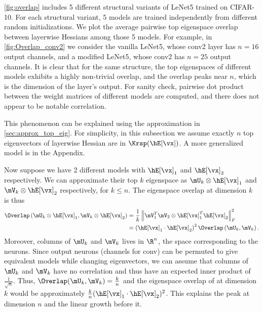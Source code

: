 \cref{fig:overlap} includes 5 different structural variants of LeNet5 trained on CIFAR-10. For each structural variant, 5 models are trained independently from different random initializations. We plot the average pairwise top eigenspace overlap between layerwise Hessians among those 5 models. For example, in \cref{fig:Overlap_conv2} we consider the vanilla LeNet5, whose conv2 layer has $n=16$ output channels, and a modified LeNet5, whose conv2 has $n=25$ output channels. It is clear that for the same structure, the top eigenspaces of different models exhibits a highly non-trivial overlap, and the overlap peaks near $n$, which is the dimension of the layer's output. For sanity check, pairwise dot product between the weight matrices of different models are computed, and there does not appear to be notable correlation.



This phenomenon can be explained using the approximation in \cref{sec:approx_top_eig}. For simplicity, in this subsection we assume exactly $n$ top eigenvectors of layerwise Hessian are in $\Krsp(\hE[\vx])$. A more generalized model is in the Appendix.

Now suppose we have 2 different models with $\hE[\vx]_1$ and $\hE[\vx]_2$ respectively. We can approximate their top $k$ eigenspace as $\mU_k \otimes \hE[\vx]_1$ and $\mV_k \otimes \hE[\vx]_2$ respectively, for $k \leq n$. The eigenspace overlap at dimension $k$ is thus
\begin{equation}
\begin{aligned}
    \Overlap\left(\mU_k \otimes \hE[\vx]_1, \mV_k \otimes \hE[\vx]_2\right) &=\frac{1}{k}\left\|\mV_1^T\mV_2 \otimes \hE[\vx]_1^T\hE[\vx]_2\right\|^2_F\\
    &= \left(\hE[\vx]_1 \cdot \hE[\vx]_2\right)^2\Overlap\left(\mU_k, \mV_k\right).
\end{aligned}
\label{eqn:model_overlap}
\end{equation}
Moreover, columns of $\mU_k$ and $\mV_k$ lives in $\R^n$, the space corresponding to the neurons. Since output neurons (channels for conv) can be permuted to give equivalent models while changing eigenvectors, we can assume that columns of $\mU_k$ and $\mV_k$ have no correlation and thus have an expected inner product of $\frac{1}{\sqrt{n}}$. Thus, $\Overlap(\mU_k, \mV_k) = \frac{k}{n}$ and the eigenspace overlap of at dimension $k$ would be approximately $\frac{k}{n}(\hE[\vx]_1 \cdot \hE[\vx]_2)^2$. This explains the peak at dimension $n$ and the linear growth before it. 

